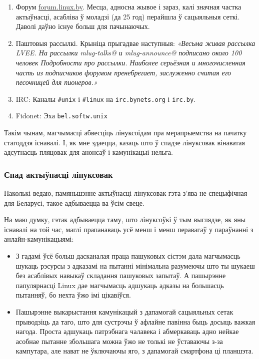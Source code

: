 \documentclass[10pt, a5paper]{article}
\def\vv!#1!{\texttt{#1}}
\begin{document}
\begin{enumerate}
  \item Форум \url{forum.linux.by}. Месца, адносна жывое і зараз, калі значная частка актыўнасці, асабліва ў моладзі (да 25 год) перайшла ў сацыяльныя сеткі. Даволі даўно існуе больш для пачынаючых.
  \item Паштовыя рассылкі. Крыніца прыгадвае наступныя: \textit{«Весьма живая рассылка LVEE. На рассылки mlug-talks@ и mlug-announce@ подписано около 100 человек Подробности про рассылки. Наиболее серьёзная и многочисленная часть из подписчиков форумом пренебрегает, заслуженно считая его песочницей для пионеров.»}
  \item IRC: Каналы \vv!\#unix! і \vv!\#linux! на \vv!irc.bynets.org! і \vv!irc.by!.
  \item Fidonet: Эха \vv!bel.softw.unix!
\end{enumerate}

Такім чынам, магчымасці абвесціць лінуксоідам пра мерапрыемства на пачатку стагоддзя існавалі. І, як мне здаецца, казаць што ў спадзе лінуксовак вінаватая адсутнасць пляцовак для анонсаў і камунікацыі нельга.

\subsubsection*{Спад актыўнасці лінуксовак}

Наколькі ведаю, памяньшэнне актыўнасці лінуксовак гэта з'ява не спецыфічная для Беларусі, такое адбываецца ва ўсім свеце.

На маю думку, гэтак адбываецца таму, што лінуксоўкі ў тым выглядзе, як яны існавалі на той час, маглі прапанаваць усё менш і менш перавагаў у параўнанні з анлайн-камунікацыямі:
\begin{itemize}
  \item З гадамі ўсё больш дасканалая праца пашуковых сістэм дала магчымасць шукаць рэсурсы з адказамі на пытанні мінімальна разумеючы што ты шукаеш без асаблівых навыкаў складання пашуковых запытаў. А пашырэнне папулярнасці Linux дае магчымасць адшукаць адказы на большасць пытанняў, бо нехта ўжо імі цікавіўся.
  \item Пашырэнне выкарыстання камунікацый з дапамогай сацыяльных сетак прыводзіць да таго, што для сустрэчы ў афлайне павінна быць досыць важкая нагода. Проста адшукаць патрэбнага чалавека і абмеркаваць адно нейкае асобнае пытанне збольшага можна ўжо не толькі не ўставаючы з-за кампутара, але нават не ўключаючы яго, з дапамогай смартфона ці планшэта.
\end{itemize}
\end{document}
